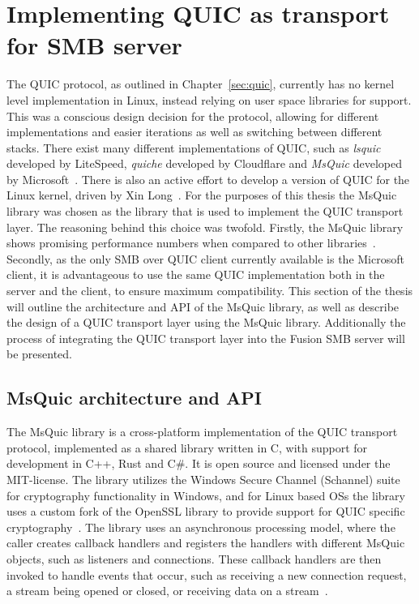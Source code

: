 \documentclass[english, 12pt, a4paper, elec, utf8, a-2b, online]{aaltothesis}
\begin{document}
\clearpage
\section{Implementing QUIC as transport for SMB server}
\label{sec:implementation}
The QUIC protocol, as outlined in Chapter~\ref{sec:quic}, currently has no kernel
level implementation in Linux, instead relying on user space libraries for support.
This was a conscious design decision for the protocol, allowing for different
implementations and easier iterations as well as switching between different stacks.
There exist many different implementations of QUIC, such as \textit{lsquic} developed by
LiteSpeed, \textit{quiche} developed by Cloudflare and \textit{MsQuic} developed by Microsoft~\cite{quic_implementations}.
There is also an active effort to develop a version of QUIC for the Linux kernel,
driven by Xin Long~\cite{quic_linux_kernel}. For the purposes of this thesis the
MsQuic library was chosen as the library that is used to implement the QUIC transport
layer. The reasoning behind this choice was twofold. Firstly, the MsQuic library
shows promising performance numbers when compared to other libraries~\cite{quic_perf}.
Secondly, as the only SMB over QUIC client currently available is the Microsoft client, it is
advantageous to use the same QUIC implementation both in the server and the client,
to ensure maximum compatibility. This section of the thesis will outline the
architecture and API of the MsQuic library, as well as describe the design of
a QUIC transport layer using the MsQuic library. Additionally the process of integrating
the QUIC transport layer into the Fusion SMB server will be presented.

\subsection{MsQuic architecture and API}
\label{sec:msquic}
The MsQuic library is a cross-platform implementation of the QUIC transport protocol,
implemented as a shared library written in C, with support for development
in C++, Rust and C\#. It is open source and licensed under the MIT-license. The library
utilizes the Windows Secure Channel (Schannel) suite for cryptography functionality
in Windows, and for Linux based OSs the library uses a custom fork of the
OpenSSL library to provide support for QUIC specific cryptography~\cite{msquic}. The
library uses an asynchronous processing model, where the caller creates callback handlers
and registers the handlers with different MsQuic objects, such as listeners and connections.
These callback handlers are then invoked to handle events that occur, such as receiving
a new connection request, a stream being opened or closed, or receiving data on a stream~\cite{msquic_docs}. 
\end{document}
